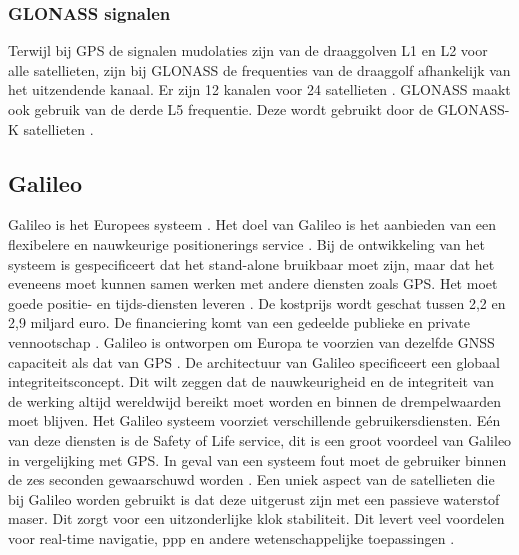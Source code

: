 \subsubsection{GLONASS signalen}
Terwijl bij GPS de signalen mudolaties zijn van de draaggolven L1 en L2 voor alle satellieten, zijn bij GLONASS de frequenties van de draaggolf afhankelijk van het uitzendende kanaal. Er zijn 12 kanalen voor 24 satellieten \cite{LBibGPS3}. GLONASS maakt ook gebruik van de derde L5 frequentie. Deze wordt gebruikt door de GLONASS-K satellieten \cite{LBibGNSS9}.  
 
\subsection{Galileo}
\label{LGal}
Galileo is het Europees systeem \cite{LBibGNSS3, LBibGNSS4}. Het doel van Galileo is het aanbieden van een flexibelere en nauwkeurige positionerings service \cite{LBibGNSS4}. Bij de ontwikkeling van het systeem is gespecificeert dat het stand-alone bruikbaar moet zijn, maar dat het eveneens moet kunnen samen werken met andere diensten zoals GPS. Het moet goede positie- en tijds-diensten leveren \cite{LBibGalileo2}. De kostprijs wordt geschat tussen 2,2 en 2,9 miljard euro. De financiering komt van een gedeelde publieke en private vennootschap \cite{LBibGNSS8}. Galileo is ontworpen om Europa te voorzien van dezelfde GNSS capaciteit als dat van GPS \cite{LBibGNSS6}. De architectuur van Galileo specificeert een globaal integriteitsconcept. Dit wilt zeggen dat de nauwkeurigheid en de integriteit van de werking altijd wereldwijd bereikt moet worden en binnen de drempelwaarden moet blijven.  Het Galileo systeem voorziet verschillende gebruikersdiensten. E\'en van deze diensten is de Safety of Life service, dit is een groot voordeel van Galileo in vergelijking met GPS. In geval van een systeem fout moet de gebruiker binnen de zes seconden gewaarschuwd worden \cite{LBibGalileo}. Een uniek aspect van de satellieten die bij Galileo worden gebruikt is dat deze uitgerust zijn met een passieve waterstof maser. Dit zorgt voor een uitzonderlijke klok stabiliteit. Dit levert veel voordelen voor real-time navigatie, ppp en andere wetenschappelijke toepassingen \cite{LBibGNSS9}.

